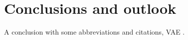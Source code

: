 
\chapter[conclusions and outlook]{Conclusions and outlook}\label{chp:conclusion}


A conclusion with some abbreviations and citations, \gls{VAE} \cite{kingma_autoencoding_2014,rezende_stochastic_2014}.



